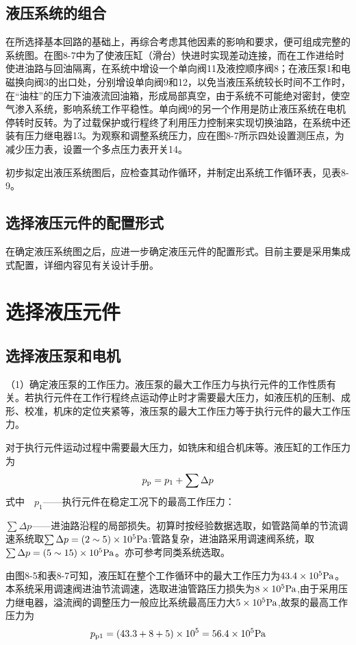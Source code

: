 
\subsection{液压系统的组合}
在所选择基本回路的基础上，再综合考虑其他因素的影响和要求，便可组成完整的系统图。在图8-7中为了使液压缸（滑台）快进时实现差动连接，而在工作进给时使进油路与回油隔离，在系统中增设一个单向阀11及液控顺序阀8；在液压泵1和电磁换向阀3的出口处，分别增设单向阀9和12，以免当液压系统较长时间不工作时，在“油柱”的压力下油液流回油箱，形成局部真空，由于系统不可能绝对密封，使空气渗入系统，影响系统工作平稳性。单向阀9的另一个作用是防止液压系统在电机停转时反转。为了过载保护或行程终了利用压力控制来实现切换油路，在系统中还装有压力继电器13。为观察和调整系统压力，应在图8-7所示四处设置测压点，为减少压力表，设置一个多点压力表开关14。

初步拟定出液压系统图后，应检查其动作循环，并制定出系统工作循环表，见表8-9。
\subsection{选择液压元件的配置形式}
在确定液压系统图之后，应进一步确定液压元件的配置形式。目前主要是采用集成式配置，详细内容见有关设计手册。
\section{选择液压元件}
\subsection{选择液压泵和电机}
（1）确定液压泵的工作压力。液压泵的最大工作压力与执行元件的工作性质有关。若执行元件在工作行程终点运动停止时才需要最大压力，如液压机的压制、成形、校准，机床的定位夹紧等，液压泵的最大工作压力等于执行元件的最大工作压力。

对于执行元件运动过程中需要最大压力，如铣床和组合机床等。液压缸的工作压力为
\begin{equation}
p_{\rm p}=p_1+\sum\Delta p 
\end{equation}
式中$\quad p_1$——执行元件在稳定工况下的最高工作压力：

$\sum\Delta p$——进油路沿程的局部损失。初算时按经验数据选取，如管路简单的节流调速系统取$\sum\Delta p=(2\sim5)\times10^5{\rm Pa}$:管路复杂，进油路采用调速阀系统，取$\sum\Delta p=(5\sim15) \times 10^5{\rm Pa}$。亦可参考同类系统选取。

由图8-5和表8-7可知，液压缸在整个工作循环中的最大工作压力为$43.4\times10^5{\rm Pa}$。本系统采用调速阀进油节流调速，选取进油管路压力损失为$8\times10^5{\rm Pa}$,由于采用压力继电器，溢流阀的调整压力一般应比系统最高压力大$5\times10^5{\rm Pa}$,故泵的最高工作压力为
$$p_{\rm p1}=(43.3+8+5)\times10^5=56.4\times10^5{\rm Pa}$$


